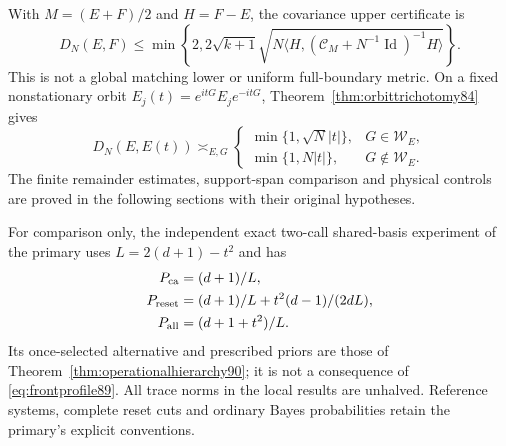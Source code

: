With $M=(E+F)/2$ and $H=F-E$, the covariance upper certificate is
\begin{equation}\label{eq:frontupper84}
 D_N(E,F)\le\min\left\{2,2\sqrt{k+1}
 \sqrt{N\langle H,(\mathcal C_M+N^{-1}\operatorname{Id})^{-1}H\rangle}
 \right\}.
\end{equation}
This is not a global matching lower or uniform full-boundary metric.
On a fixed nonstationary orbit $E_j(t)=e^{itG}E_je^{-itG}$,
Theorem~\ref{thm:orbittrichotomy84} gives
\begin{equation}\label{eq:frontorbit84}
 D_N(E,E(t))\asymp_{E,G}
 \begin{cases}
 \min\{1,\sqrt N|t|\},&G\in\mathcal W_E,\\
 \min\{1,N|t|\},&G\notin\mathcal W_E.
 \end{cases}
\end{equation}
The finite remainder estimates, support-span comparison and physical
controls are proved in the following sections with their original
hypotheses.

For comparison only, the independent exact two-call shared-basis
experiment of the primary uses $L=2(d+1)-t^2$ and has
\begin{equation}\label{eq:fronthierarchy90}
 \begin{split}
 P_{\rm ca}&=(d+1)/L,\\
 P_{\rm reset}&=(d+1)/L+t^2(d-1)/(2dL),\\
 P_{\rm all}&=(d+1+t^2)/L.
 \end{split}
\end{equation}
Its once-selected alternative and prescribed priors are those of
Theorem~\ref{thm:operationalhierarchy90}; it is not a consequence of
\eqref{eq:frontprofile89}.  All trace norms in the local results are
unhalved.  Reference systems, complete reset cuts and ordinary Bayes
probabilities retain the primary's explicit conventions.
